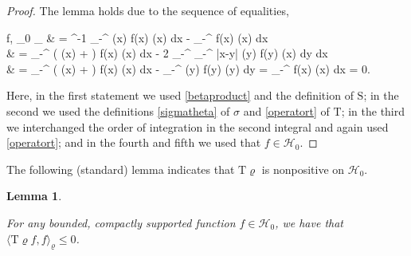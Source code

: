 \documentclass{amsart}
\numberwithin{equation}{section}
\newtheorem{lem}[thm]{Lemma}
\theoremstyle{remark}
\theoremstyle{definition}
\begin{document}
	\begin{proof}
		
		The lemma holds due to the sequence of equalities,
		\begin{flalign*}
			\langle {} f, \varsigma_0 \rangle_{\varrho} & = \theta^{-1} \displaystyle\int_{-\infty}^{\infty} \sigma (x) f(x) \varrho(x)  dx - \displaystyle\int_{-\infty}^{\infty}  f(x) \cdot \varrho (x) dx \\ 
			& = \displaystyle\int_{-\infty}^{\infty} (  \varrho (x) + \alpha ) \cdot f(x) \varrho (x) dx - 2 \displaystyle\int_{-\infty}^{\infty} \displaystyle\int_{-\infty}^{\infty} \log|x-y| \cdot \varrho (y) f(y) \cdot \varrho (x) dy dx \\
			& = \displaystyle\int_{-\infty}^{\infty} (  \varrho (x) + \alpha ) \cdot f(x) \varrho (x) dx - \displaystyle\int_{-\infty}^{\infty}  \varrho (y) \cdot f(y) \varrho (y) dy = \alpha \displaystyle\int_{-\infty}^{\infty} f(x) \varrho (x) dx = 0.
		\end{flalign*}
		
		\noindent Here, in the first statement we used \eqref{betaproduct} and the definition of $\bm{\mathrm{S}}$; in the second we used the definitions \eqref{sigmatheta} of $\sigma$ and \eqref{operatort} of $\bm{\mathrm{T}}$; in the third we interchanged the order of integration in the second integral and again used \eqref{operatort}; and in the fourth and fifth we used that $f \in \mathcal{H}_0$. 
	\end{proof}
		
	The following (standard) lemma indicates that $\bm{\mathrm{T} \varrho}$ is nonpositive on $\mathcal{H}_0$. 
	
	\begin{lem} 
		
		\label{tg0} 
		
		For any bounded, compactly supported function $f \in \mathcal{H}_0$, we have that $\langle \bm{\mathrm{T} \varrho} f, f \rangle_{\varrho} \le 0$. 
	
	\end{lem} 
	
\end{document}
